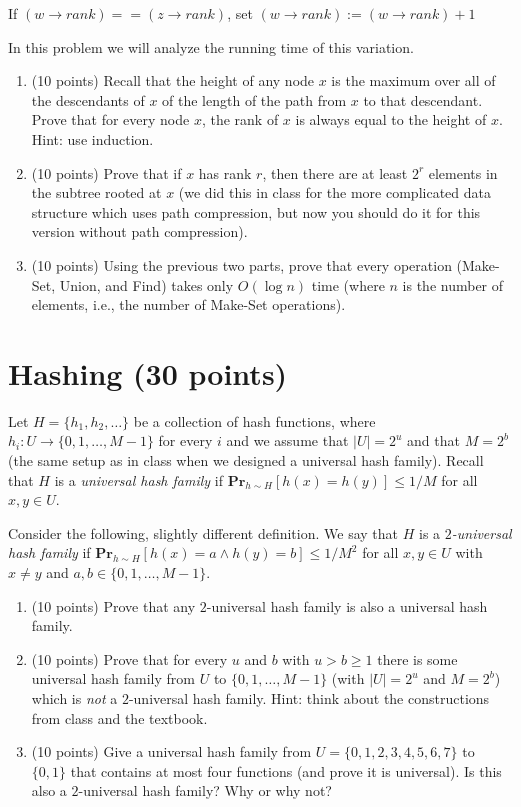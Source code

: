 \documentclass[11pt]{article}
\begin{document}
\qquad If $(w \rightarrow rank) == (z \rightarrow rank)$, set $(w \rightarrow rank) := (w \rightarrow rank) + 1$

\noindent In this problem we will analyze the running time of this variation.

\begin{enumerate}
\item (10 points) Recall that the height of any node $x$ is the maximum over all of the descendants of $x$ of the length of the path from $x$ to that descendant.  Prove that for every node $x$, the rank of $x$ is always equal to the height of $x$.  Hint: use induction.

\item (10 points) Prove that if $x$ has rank $r$, then there are at least $2^r$ elements in the subtree rooted at $x$ (we did this in class for the more complicated data structure which uses path compression, but now you should do it for this version without path compression).

\item (10 points) Using the previous two parts, prove that every operation (Make-Set, Union, and Find) takes only $O(\log n)$ time (where $n$ is the number of elements, i.e., the number of Make-Set operations).  

\end{enumerate}


\section{Hashing (30 points)}

Let $H = \{h_1, h_2, \dots\}$ be a collection of hash functions, where $h_i : U \rightarrow \{0, 1, \dots, M-1\}$ for every $i$ and we assume that $|U| = 2^u$ and that $M = 2^b$ (the same setup as in class when we designed a universal hash family).  Recall that $H$ is a \emph{universal hash family} if $\textbf{Pr}_{h \sim H} [h(x) = h(y)] \leq 1/M$ for all $x,y \in U$.  

Consider the following, slightly different definition.  We say that $H$ is a \emph{$2$-universal hash family} if $\textbf{Pr}_{h \sim H}[h(x) = a \land h(y) = b] \leq 1/M^2$ for all $x,y \in U$ with $x \neq y$ and $a,b \in \{0,1,\dots,M-1\}$.  

\begin{enumerate}
\item (10 points)  Prove that any $2$-universal hash family is also a universal hash family. 

\item (10 points) Prove that for every $u$ and $b$ with $u > b \geq 1$ there is some universal hash family from $U$ to $\{0,1,\dots, M-1\}$ (with $|U| = 2^u$ and $M = 2^b$) which is \emph{not} a $2$-universal hash family.  Hint: think about the constructions from class and the textbook.

\item (10 points) Give a universal hash family from $U = \{0,1,2,3,4,5,6,7\}$ to $\{0,1\}$ that contains at most four functions (and prove it is universal).  Is this also a $2$-universal hash family?  Why or why not?  

\end{enumerate}
\end{document}

